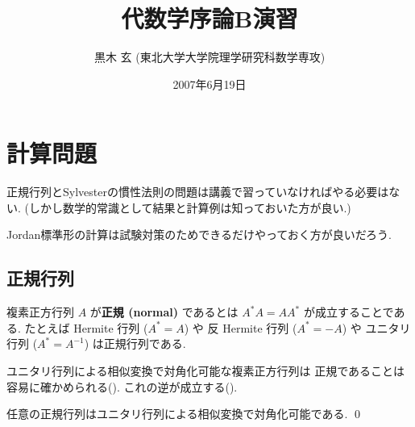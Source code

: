 \documentclass[12pt,twoside]{jarticle}
\begin{document}

\title{\bf 代数学序論B演習}
\author{黒木 玄 \quad (東北大学大学院理学研究科数学専攻)}
\date{2007年6月19日}

\maketitle

\tableofcontents


\section{計算問題}

正規行列とSylvesterの慣性法則の問題は講義で習っていなければやる必要はない. 
(しかし数学的常識として結果と計算例は知っておいた方が良い.)

Jordan標準形の計算は試験対策のためできるだけやっておく方が良いだろう.


\subsection{正規行列}

複素正方行列 $A$ が{\bf 正規 (normal)} であるとは $A^*A=AA^*$ 
が成立することである. 
たとえば Hermite 行列 ($A^*=A$) や
反 Hermite 行列 ($A^*=-A$) や
ユニタリ行列 ($A^*=A^{-1}$) は正規行列である.

ユニタリ行列による相似変換で対角化可能な複素正方行列は
正規であることは容易に確かめられる().
これの逆が成立する().

\begin{theorem}
  任意の正規行列はユニタリ行列による相似変換で対角化可能である. \qed
\end{theorem}
\end{document}
